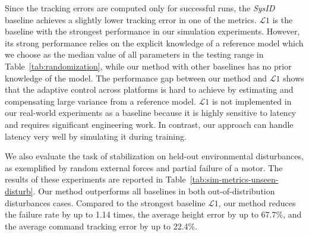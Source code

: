 Since the tracking errors are computed only for successful runs, the \emph{SysID} baseline achieves a slightly lower tracking error in one of the metrics.
%
$\mathcal{L}1$ is the baseline with the strongest performance in our simulation experiments. However, its strong performance relies on the explicit knowledge of a reference model which we choose as the median value of all parameters in the testing range in Table~\ref{tab:randomization}, while our method with other baselines has no prior knowledge of the model. 
%
The performance gap between our method and $\mathcal{L}1$ shows that the adaptive control across platforms is hard to achieve by estimating and compensating large variance from a reference model. 
%
$\mathcal{L}1$ is not implemented in our real-world experiments as a baseline because it is highly sensitive to latency and requires significant engineering work. In contrast, our approach can handle latency very well by simulating it during training.
%

We also evaluate the task of stabilization on held-out environmental disturbances, as exemplified by random external forces and partial failure of a motor. The results of these experiments are reported in Table~\ref{tab:sim-metrics-unseen-disturb}. Our method outperforms all baselines in both out-of-distribution disturbances cases. Compared to the strongest baseline $\mathcal{L}1$, our method reduces the failure rate by up to 1.14 times, the average height error by up to 67.7\%,  and the average command tracking error by up to 22.4\%. 


